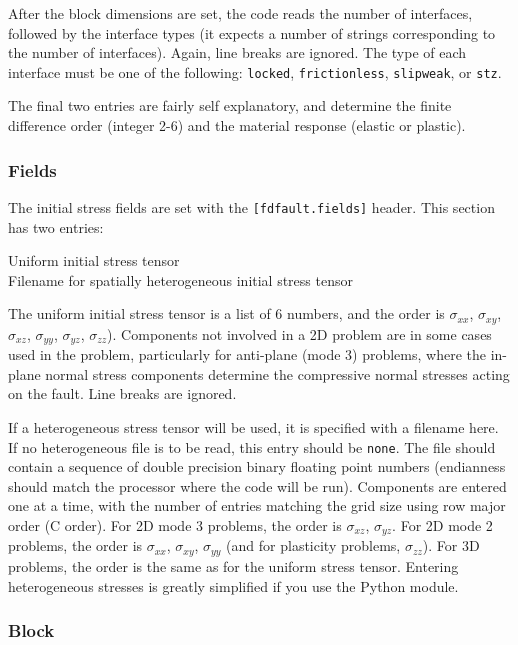 \documentclass[12pt]{article}   	%
\begin{document}
After the block dimensions are set, the code reads the number of interfaces, followed by the interface types (it expects a number of strings corresponding to the number of interfaces). Again, line breaks are ignored. The type of each interface must be one of the following: {\tt locked}, {\tt frictionless}, {\tt slipweak}, or {\tt stz}.

The final two entries are fairly self explanatory, and determine the finite difference order (integer 2-6) and the material response (elastic or plastic).

\subsubsection{Fields}

The initial stress fields are set with the {\tt [fdfault.fields]} header. This section has two entries:

\vspace{0.1in}
Uniform initial stress tensor \\
\indent Filename for spatially heterogeneous initial stress tensor

\vspace{0.1in}
\noindent The uniform initial stress tensor is a list of 6 numbers, and the order is $\sigma_{xx}$, $\sigma_{xy}$, $\sigma_{xz}$, $\sigma_{yy}$, $\sigma_{yz}$, $\sigma_{zz}$). Components not involved in a 2D problem are in some cases used in the problem, particularly for anti-plane (mode 3) problems, where the in-plane normal stress components determine the compressive normal stresses acting on the fault. Line breaks are ignored.

If a heterogeneous stress tensor will be used, it is specified with a filename here. If no heterogeneous file is to be read, this entry should be {\tt none}. The file should contain a sequence of double precision binary floating point numbers (endianness should match the processor where the code will be run). Components are entered one at a time, with the number of entries matching the grid size using row major order (C order). For 2D mode 3 problems, the order is $\sigma_{xz}$, $\sigma_{yz}$. For 2D mode 2 problems, the order is $\sigma_{xx}$, $\sigma_{xy}$, $\sigma_{yy}$ (and for plasticity problems, $\sigma_{zz}$). For 3D problems, the order is the same as for the uniform stress tensor. Entering heterogeneous stresses is greatly simplified if you use the Python module.

\subsubsection{Block}
\end{document}
